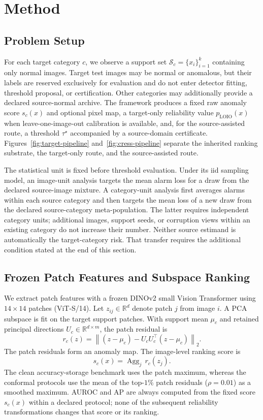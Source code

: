 \section{Method}\label{sec:method}
\subsection{Problem Setup}
For each target category $c$, we observe a support set $\mathcal{S}_c=\{x_i\}_{i=1}^{k}$ containing only normal images. Target test images may be normal or anomalous, but their labels are reserved exclusively for evaluation and do not enter detector fitting, threshold proposal, or certification. Other categories may additionally provide a declared source-normal archive. The framework produces a fixed raw anomaly score $s_c(x)$ and optional pixel map, a target-only reliability value $p_{\mathrm{LOIO}}(x)$ when leave-one-image-out calibration is available, and, for the source-assisted route, a threshold $\tau^\star$ accompanied by a source-domain certificate. Figures~\ref{fig:target-pipeline} and~\ref{fig:cress-pipeline} separate the inherited ranking substrate, the target-only route, and the source-assisted route.

The statistical unit is fixed before threshold evaluation. Under its iid sampling model, an image-unit analysis targets the mean alarm loss for a draw from the declared source-image mixture. A category-unit analysis first averages alarms within each source category and then targets the mean loss of a new draw from the declared source-category meta-population. The latter requires independent category units; additional images, support seeds, or corruption views within an existing category do not increase their number. Neither source estimand is automatically the target-category risk. That transfer requires the additional condition stated at the end of this section.

\subsection{Frozen Patch Features and Subspace Ranking}
We extract patch features with a frozen DINOv2 small Vision Transformer using $14\times14$ patches (ViT-S/14). Let $z_{ij}\in\mathbb{R}^{d}$ denote patch $j$ from image $i$. A PCA subspace is fit on the target support patches. With support mean $\mu_c$ and retained principal directions $U_c\in\mathbb{R}^{d\times m}$, the patch residual is
\begin{equation}\label{eq:residual}
    r_c(z)=\left\|(z-\mu_c)-U_cU_c^{\top}(z-\mu_c)\right\|_2.
\end{equation}
The patch residuals form an anomaly map. The image-level ranking score is
\begin{equation}\label{eq:score}
    s_c(x)=\operatorname{Agg}_{j}\,r_c(z_j).
\end{equation}
The clean accuracy-storage benchmark uses the patch maximum, whereas the conformal protocols use the mean of the top-$1\%$ patch residuals ($\rho=0.01$) as a smoothed maximum. AUROC and AP are always computed from the fixed score $s_c(x)$ within a declared protocol; none of the subsequent reliability transformations changes that score or its ranking.

